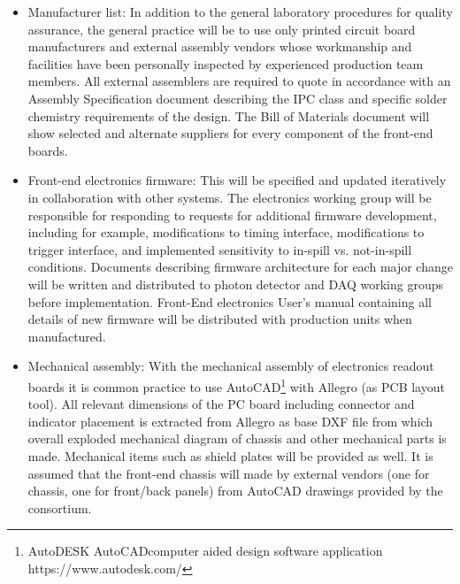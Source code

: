 \begin{itemize}
\item Manufacturer list: In addition to the general laboratory procedures for quality assurance, the general practice will be to use only printed circuit board manufacturers and external assembly vendors whose workmanship and facilities have been personally inspected by experienced production team members. All external assemblers are required to quote in accordance with an Assembly Specification document describing the IPC class and specific solder chemistry requirements of the design. The Bill of Materials document will show selected and alternate suppliers for every component of the front-end boards.

\item Front-end electronics firmware: This will be specified and updated iteratively in collaboration with other systems. The electronics working group will be responsible for responding to requests for additional firmware development, including for example, modifications to timing interface, modifications to trigger interface, and implemented sensitivity to in-spill vs. not-in-spill conditions. Documents describing firmware architecture for each major change will be written and distributed to photon detector and DAQ working groups before implementation. Front-End electronics User's manual containing all details of new firmware will be distributed with production units when manufactured.

\item Mechanical assembly: With the mechanical assembly of electronics readout boards it is common practice to use AutoCAD\footnote{AutoDESK AutoCAD\textregistered computer aided design software application https://www.autodesk.com/} with Allegro (as PCB layout tool). All relevant dimensions of the PC board including connector and indicator placement is extracted from Allegro as base DXF file from which overall exploded mechanical diagram of chassis and other mechanical parts is made. Mechanical items such as shield plates will be provided as well. It is assumed that the front-end chassis will made by external vendors (one for chassis, one for front/back panels) from AutoCAD drawings provided by the consortium.

\end{itemize}
